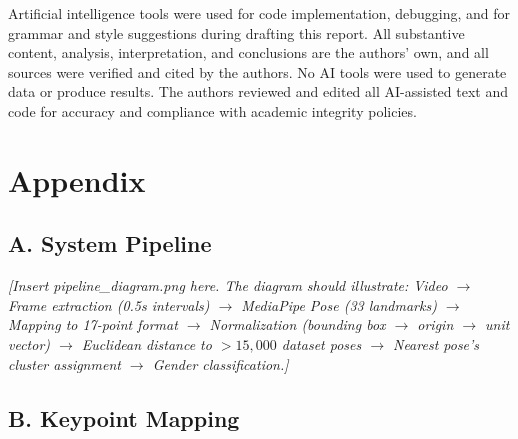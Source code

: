 \documentclass[12pt, a4paper]{article}
\begin{document}
Artificial intelligence tools were used for code implementation, debugging, and for grammar and style suggestions during drafting this report. All substantive content, analysis, interpretation, and conclusions are the authors' own, and all sources were verified and cited by the authors. No AI tools were used to generate data or produce results. The authors reviewed and edited all AI-assisted text and code for accuracy and compliance with academic integrity policies.





\newpage
\appendix
\section*{Appendix}

\subsection*{A. System Pipeline}


\noindent\textit{[Insert pipeline\_diagram.png here. The diagram should illustrate: Video $\rightarrow$ Frame extraction (0.5s intervals) $\rightarrow$ MediaPipe Pose (33 landmarks) $\rightarrow$ Mapping to 17-point format $\rightarrow$ Normalization (bounding box $\rightarrow$ origin $\rightarrow$ unit vector) $\rightarrow$ Euclidean distance to $>15,000$ dataset poses $\rightarrow$ Nearest pose's cluster assignment $\rightarrow$ Gender classification.]}

\subsection*{B. Keypoint Mapping}
\end{document}
